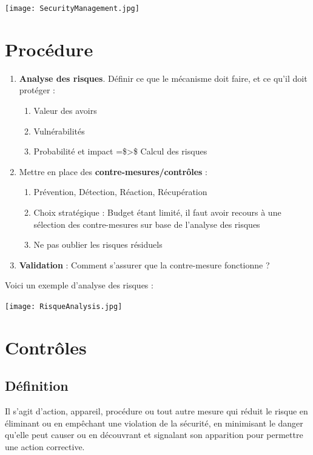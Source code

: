 \documentclass{report}
\begin{document}
\texttt{[image: SecurityManagement.jpg]}

\section{Procédure}

\begin{enumerate}
    \item \textbf{Analyse des risques}. Définir ce que le mécanisme doit faire, et ce qu'il doit protéger :
    \begin{enumerate}
        \item Valeur des avoirs
        \item Vulnérabilités
        \item Probabilité et impact =\$\textgreater\$ Calcul des risques
    \end{enumerate}

    \item Mettre en place des \textbf{contre-mesures/contrôles} :
    \begin{enumerate}
        \item Prévention, Détection, Réaction, Récupération
        \item Choix stratégique : Budget étant limité, il faut avoir recours à une sélection des contre-mesures sur base de l'analyse des risques
        \item Ne pas oublier les risques résiduels
    \end{enumerate}

    \item \textbf{Validation} : Comment s'assurer que la contre-mesure fonctionne ?
\end{enumerate}

Voici un exemple d'analyse des risques :

\texttt{[image: RisqueAnalysis.jpg]}

\section{Contrôles}

\subsection{Définition}

Il s'agit d'action, appareil, procédure ou tout autre mesure qui réduit le risque en éliminant ou en empêchant une violation de la sécurité, en minimisant le danger qu'elle peut causer ou en découvrant et signalant son apparition pour permettre une action corrective.
\end{document}
